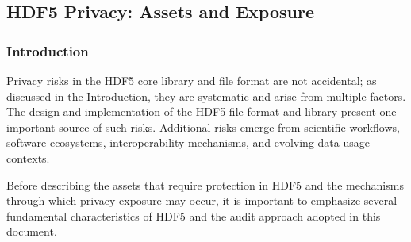 \documentclass[../main.tex]{subfiles}
\begin{document}
\subsection{HDF5 Privacy: Assets and Exposure}

\subsubsection{Introduction} 

Privacy risks in the HDF5 core library and file format are not accidental; as discussed
in the Introduction, they are systematic and arise from multiple factors. The design and
implementation of the HDF5 file format and library present one important source of such risks.
Additional risks emerge from scientific workflows, software ecosystems, interoperability
mechanisms, and evolving data usage contexts.

Before describing the assets that require protection in HDF5 and the mechanisms through
which privacy exposure may occur, it is important to emphasize several fundamental
characteristics of HDF5 and the audit approach adopted in this document.
\end{document}
